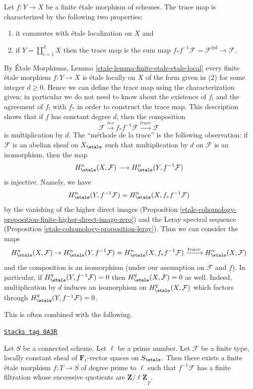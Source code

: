 Let $f : Y \to X$ be a finite \'etale morphism of schemes. The trace map is
characterized by the following two properties:
\begin{enumerate}
\item it commutes with \'etale localization on $X$ and
\item if $Y = \coprod_{i = 1}^d X$ then the trace map is
the sum map $f_*f^{-1} \mathcal{F} = \mathcal{F}^{\oplus d} \to \mathcal{F}$.
\end{enumerate}
By \'Etale Morphisms, Lemma \ref{etale-lemma-finite-etale-etale-local}
every finite \'etale morphism $f : Y \to X$ is \'etale locally on $X$
of the form given in (2) for some integer $d \geq 0$. Hence we
can define the trace map using the characterization given; in particular
we do not need to know about the existence of $f_!$ and the agreement
of $f_!$ with $f_*$ in order to construct the trace map.
This description shows that if $f$ has constant degree $d$, then
the composition
$$
\mathcal{F} \xrightarrow{res}
f_* f^{-1} \mathcal{F} \xrightarrow{trace}
\mathcal{F}
$$
is multiplication by $d$. The ``m\'ethode de la trace''
is the following observation: if $\mathcal{F}$
is an abelian sheaf on $X_\etale$ such that multiplication by $d$
on $\mathcal{F}$ is an isomorphism, then the map
$$
H^n_\etale(X, \mathcal{F}) \longrightarrow H^n_\etale(Y, f^{-1}\mathcal{F})
$$
is injective. Namely, we have
$$
H^n_\etale(Y, f^{-1}\mathcal{F}) = H^n_\etale(X, f_*f^{-1}\mathcal{F})
$$
by the vanishing of the higher direct images
(Proposition \ref{etale-cohomology-proposition-finite-higher-direct-image-zero})
and the Leray spectral sequence
(Proposition \ref{etale-cohomology-proposition-leray}).
Thus we can consider the maps
$$
H^n_\etale(X, \mathcal{F}) \to
H^n_\etale(Y, f^{-1}\mathcal{F})= H^n_\etale(X, f_*f^{-1}\mathcal{F})
\xrightarrow{trace}
H^n_\etale(X, \mathcal{F})
$$
and the composition is an isomorphism (under our assumption on $\mathcal{F}$
and $f$). In particular, if
$H_\etale^q(Y, f^{-1}\mathcal{F}) = 0$ then
$H_\etale^q(X, \mathcal{F}) = 0$ as well.
Indeed, multiplication by $d$ induces an
isomorphism on $H_\etale^q(X, \mathcal{F})$ which factors through
$H_\etale^q(Y, f^{-1}\mathcal{F})= 0$.

\medskip\noindent
This is often combined with the following.

\begin{lemma}
\label{etale-cohomology-lemma-pullback-filtered}
\href{https://stacks.math.columbia.edu/tag/0A3R}{\texttt{Stacks tag 0A3R}}

Let $S$ be a connected scheme. Let $\ell$ be a prime number. Let
$\mathcal{F}$ be a finite type, locally constant sheaf of
$\mathbf{F}_\ell$-vector spaces on $S_\etale$.
Then there exists a finite \'etale morphism
$f : T \to S$ of degree prime to $\ell$ such that $f^{-1}\mathcal{F}$
has a finite filtration whose successive quotients are
$\underline{\mathbf{Z}/\ell\mathbf{Z}}_T$.
\end{lemma}

